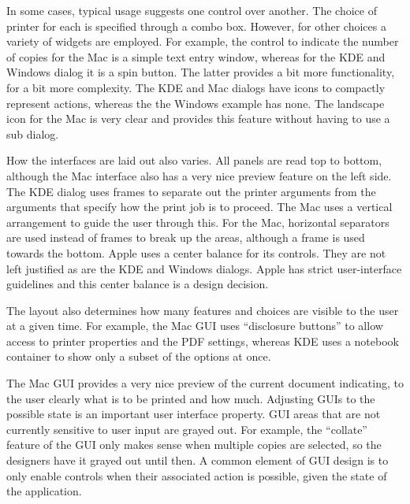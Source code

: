 In some cases, typical usage suggests one control over another. The
choice of printer for each is specified through a combo box. However,
for other choices a variety of widgets are employed. For example, the
control to indicate the number of copies for the Mac is a simple text
entry window, whereas for the KDE and Windows dialog it
is a spin button. The latter provides a bit more functionality, for a
bit more complexity. The KDE and Mac dialogs have icons to
compactly represent actions, whereas the the Windows example has none. The
landscape icon for the Mac is very clear and provides this feature
without having to use a sub dialog.


How the interfaces are laid out also varies.  All
panels are read top to bottom, although the Mac interface also has a very
nice preview feature on the left side. The KDE dialog uses frames to
separate out the printer arguments from the arguments that specify how
the print job is to proceed. The Mac uses a vertical arrangement to
guide the user through this. For the Mac, horizontal separators are
used instead of frames to break up the areas, although a frame is used
towards the bottom. Apple uses a center balance for its controls. They
are not left justified as are the KDE and Windows dialogs. Apple has
strict user-interface guidelines and this center balance is a design
decision.

The layout also determines how many features and choices are visible to the
user at a given time.  For example, the Mac GUI uses ``disclosure
buttons'' to allow access to printer properties and the PDF settings,
whereas KDE uses a notebook container to show only a subset of the
options at once.

The Mac GUI provides a very nice preview of the current document
indicating, to the user clearly what is to be printed and how
much. Adjusting GUIs to the possible state is an important user
interface property.  GUI areas that are not currently sensitive to
user input are grayed out. For example, the ``collate'' feature of the
GUI only makes sense when multiple copies are selected, so the
designers have it grayed out until then. A common element of GUI
design is to only enable controls when their associated action is
possible, given the state of the application.

